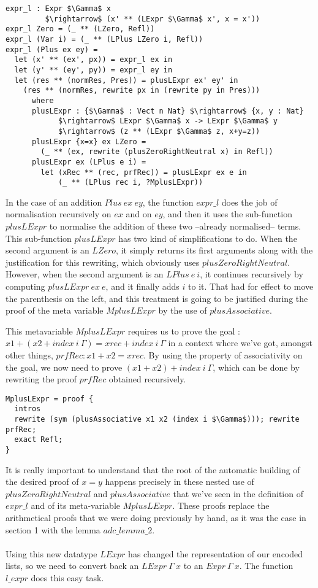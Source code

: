 \begin{lstlisting}
expr_l : Expr $\Gamma$ x 
         $\rightarrow$ (x' ** (LExpr $\Gamma$ x', x = x'))
expr_l Zero = (_ ** (LZero, Refl))
expr_l (Var i) = (_ ** (LPlus LZero i, Refl))
expr_l (Plus ex ey) = 
  let (x' ** (ex', px)) = expr_l ex in
  let (y' ** (ey', py)) = expr_l ey in
  let (res ** (normRes, Pres)) = plusLExpr ex' ey' in
    (res ** (normRes, rewrite px in (rewrite py in Pres)))
      where 
      plusLExpr : {$\Gamma$ : Vect n Nat} $\rightarrow$ {x, y : Nat} 
            $\rightarrow$ LExpr $\Gamma$ x -> LExpr $\Gamma$ y  
            $\rightarrow$ (z ** (LExpr $\Gamma$ z, x+y=z))
      plusLExpr {x=x} ex LZero =
        (_ ** (ex, rewrite (plusZeroRightNeutral x) in Refl))            
      plusLExpr ex (LPlus e i) =
        let (xRec ** (rec, prfRec)) = plusLExpr ex e in
            (_ ** (LPlus rec i, ?MplusLExpr))

\end{lstlisting}

In the case of an addition $Plus\ ex\ ey$, the function $expr\_l$ does the job of normalisation recursively on $ex$ and on $ey$, and then it uses the sub-function $plusLExpr$ to normalise the addition of these two --already normalised-- terms. This sub-function $plusLExpr$ has two kind of simplifications to do. When the second argument is an $LZero$, it simply returns its first arguments along with the justification for this rewriting, which obviously uses $plusZeroRightNeutral$. However, when the second argument is an $LPlus\ e\ i$, it continues recursively by computing $plusLExpr\ ex\ e$, and it finally adds $i$ to it. That had for effect to move the parenthesis on the left, and this treatment is going to be justified during the proof of the meta variable $MplusLExpr$ by the use of $plusAssociative$.

This metavariable $MplusLExpr$ requires us to prove the goal : $x1 + (x2 + index\ i\ \Gamma) = xrec + index\ i\ \Gamma$ in a context where we've got, amongst other things, $prfRec : x1 + x2 = xrec$.
By using the property of associativity on the goal, we now need to prove $(x1 + x2) + index\ i\ \Gamma$, which can be done by rewriting the proof $prfRec$ obtained recursively.


\begin{lstlisting}
MplusLExpr = proof {
  intros
  rewrite (sym (plusAssociative x1 x2 (index i $\Gamma$))); rewrite prfRec; 
  exact Refl;
}
\end{lstlisting}


It is really important to understand that the root of the automatic building of the desired proof of $x=y$ happens precisely in these nested use of $plusZeroRightNeutral$ and $plusAssociative$ that we've seen in the definition of $expr\_l$ and of its meta-variable $MplusLExpr$. These proofs replace the arithmetical proofs that we were doing previously by hand, as it was the case in section 1 with the lemma $adc\_lemma\_2$. \\
\\
Using this new datatype $LExpr$ has changed the representation of our encoded lists, so we need to convert back an $LExpr\ \Gamma\ x$ to an $Expr\ \Gamma\ x$. The function $l\_expr$ does this easy task.


